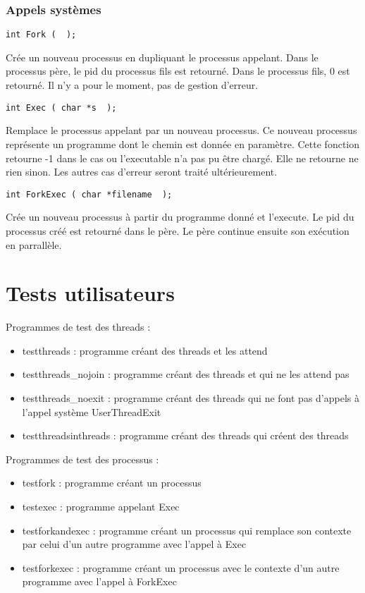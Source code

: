 \documentclass{report}
\begin{document}
\subsection{Appels systèmes}

\begin{verbatim}
int Fork (  );
\end{verbatim}
Crée un nouveau processus en dupliquant le processus appelant. Dans le processus père, le pid du processus fils est retourné. Dans le processus fils, 0 est retourné. 
Il n'y a pour le moment, pas de gestion d'erreur.

\begin{verbatim}
int Exec ( char *s  );
\end{verbatim}
Remplace le processus appelant par un nouveau processus. Ce nouveau processus représente un programme dont le chemin est donnée en paramètre.
Cette fonction retourne -1 dans le cas ou l'executable n'a pas pu être chargé. Elle ne retourne ne rien sinon. Les autres cas d'erreur seront traité ultérieurement. 

\begin{verbatim}
int ForkExec ( char *filename  );
\end{verbatim}
Crée un nouveau processus à partir du programme donné et l'execute. Le pid du processus créé est retourné dans le père.
Le père continue ensuite son exécution en parrallèle.


\chapter{Tests utilisateurs}

Programmes de test des threads :

\begin{itemize}
  \item testthreads : programme créant des threads et les attend
  \item testthreads\_nojoin : programme créant des threads et qui ne les attend pas
  \item testthreads\_noexit : programme créant des threads qui ne font pas d'appels à l'appel système UserThreadExit
  \item testthreadsinthreads : programme créant des threads qui créent des threads
\end{itemize}

Programmes de test des processus :

\begin{itemize}
  \item testfork : programme créant un processus
  \item testexec : programme appelant Exec
  \item testforkandexec : programme créant un processus qui remplace son contexte par celui d'un autre programme avec l'appel à Exec
  \item testforkexec : programme créant un processus avec le contexte d'un autre programme avec l'appel à ForkExec
\end{itemize}
\end{document}
